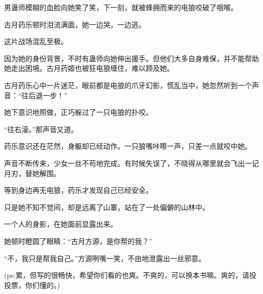 \begin{this_body}
男蛊师模糊的血脸向她笑了笑，下一刻，就被蜂拥而来的电狼咬破了咽喉。

古月药乐顿时泪流满面，她一边哭，一边逃。

这片战场混乱至极。

因为她的身份背景，不时有蛊师向她伸出援手。但他们大多自身难保，并不能帮助她走出困境。古月药姬也被狂电狼缠住，难以顾及她。

古月药乐心中一片迷茫，眼前都是电狼的爪牙幻影，慌乱当中，她忽然听到一个声音：“往后退一步！”

她下意识地照做，正巧躲过了一只电狼的扑咬。

“往右滚。”那声音又道。

药乐意识还在茫然，身躯却已经动作。一只狼嘴咔嚓一声，只差一点就咬中她。

声音不断传来，少女一丝不苟地完成。有时候失误了，不晓得从哪里就会飞出一记月刃，替她解围。

等到身边再无电狼，药乐才发现自己已经安全。

只是她不知不觉间，却是远离了山寨，站在了一处偏僻的山林中。

一个人的身影，在她面前显露出来。

她顿时瞪圆了眼睛：“古月方源，是你帮的我？”

“不，我只是帮我自己。”方源咧嘴一笑，不由地泄露出一丝邪意。

(ps:累，但写的很畅快，希望你们看的也爽。不爽的，可以换本书嘛。爽的，请投投票，你们懂的。)

\end{this_body}

